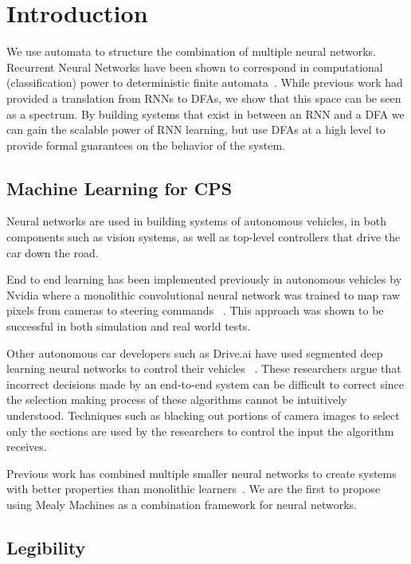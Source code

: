 \section{Introduction}

We use automata to structure the combination of multiple neural networks.
Recurrent Neural Networks have been shown to correspond in computational (classification) power to deterministic finite automata~\cite{tino1998finite}.
While previous work had provided a translation from RNNs to DFAs, we show that this space can be seen as a spectrum.
By building systems that exist in between an RNN and a DFA we can gain the scalable power of RNN learning, but use DFAs at a high level to provide formal guarantees on the behavior of the system.

\subsection{Machine Learning for CPS}

Neural networks are used in building systems of autonomous vehicles, in both components such as vision systems, as well as top-level controllers that drive the car down the road.

End to end learning has been implemented previously in autonomous vehicles by Nvidia where a monolithic convolutional neural network was trained to map raw pixels from cameras to steering commands ~\cite{parallelforall}. This approach was shown to be successful in both simulation and real world tests.

Other autonomous car developers such as Drive.ai have used segmented deep learning neural networks to control their vehicles ~\cite{}. These researchers argue that incorrect decisions made by an end-to-end system can be difficult to correct since the selection making process of these algorithms cannot be intuitively understood. Techniques such as blacking out portions of camera images to select only the sections are used by the researchers to control the input the algorithm receives. 


Previous work has combined multiple smaller neural networks to create systems with better properties than monolithic learners~\cite{masoudnia2014mixture,baldacchino2016variational}.
We are the first to propose using Mealy Machines as a combination framework for neural networks.

\subsection{Legibility}

